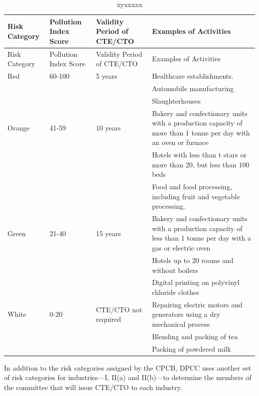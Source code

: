 \documentclass[a4paper, 12pt]{article}
\newcommand\tabitem{\makebox[1em][r]{\textbullet~}}
\begin{document}



\begin{longtable}{p{2cm}>{\raggedright}p{3.5cm}>{\raggedright}p{3.5cm}>{\raggedright\arraybackslash}p{6cm}}
\caption{xyxxxxx} \\
Risk Category & Pollution Index Score & Validity Period of CTE/CTO & Examples of Activities \\
\midrule
\endfirsthead
Risk Category & Pollution Index Score & Validity Period of CTE/CTO & Examples of Activities \\
\midrule
\endhead
\endfoot
\endlastfoot

Red & 60-100 & 5 years & \tabitem Healthcare establishments. \\
 &  &  &   \tabitem Automobile manufacturing \\
  &  &  &  \tabitem Slaughterhouses \\
Orange & 41-59 & 10 years &  \tabitem Bakery and confectionary units with a production capacity of more than 1 tonne per day with an oven or furnace  \\
 &  &  & \tabitem Hotels with less than t stars or more than 20, but less than 100 beds \\
 &  &  & \tabitem Food and food processing, including fruit and vegetable processing.  \\
Green & 21-40 & 15 years & \tabitem Bakery and confectionary units with a production capacity of less than 1 tonne per day with a gas or electric oven \\
 &  &  &  \tabitem Hotels up to 20 rooms and without boilers \\
 &  &  & \tabitem Digital printing on polyvinyl chloride clothes \\
White & 0-20 & CTE/CTO not required & \tabitem Repairing electric motors and generators using a dry mechanical process \\
 &  &  & \tabitem Blending and packing of tea \\
 &  &  & \tabitem Packing of powdered milk \\

\end{longtable}

                                  
                 In addition to the risk categories assigned by the CPCB, DPCC uses another set of risk categories for industries—I, II(a) and II(b)—to determine the members of the committee that will issue CTE/CTO to each industry.\\
                 
\end{document}
